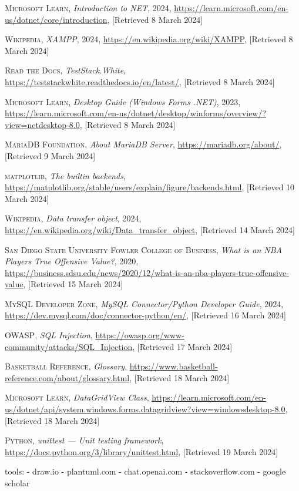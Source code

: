 \documentclass{thesis-ekf}
\theoremstyle{definition}
\theoremstyle{remark}
\begin{document}
\begin{thebibliography}{2}
\textsc{Microsoft Learn},
\emph{Introduction to NET}, 2024, 
\url{https://learn.microsoft.com/en-us/dotnet/core/introduction}, [Retrieved 8 March 2024]

\textsc{Wikipedia},
\emph{XAMPP}, 2024,
\url{https://en.wikipedia.org/wiki/XAMPP}, [Retrieved 8 March 2024]

\textsc{Read the Docs},
\emph{TestStack.White},
\url{https://teststackwhite.readthedocs.io/en/latest/}, [Retrieved 8 March 2024]

\textsc{Microsoft Learn},
\emph{Desktop Guide (Windows Forms .NET)}, 2023,
\url{https://learn.microsoft.com/en-us/dotnet/desktop/winforms/overview/?view=netdesktop-8.0}, [Retrieved 8 March 2024]

\textsc{MariaDB Foundation},
\emph{About MariaDB Server},
\url{https://mariadb.org/about/}, [Retrieved 9 March 2024]

\textsc{matplotlib},
\emph{The builtin backends},
\url{https://matplotlib.org/stable/users/explain/figure/backends.html}, [Retrieved 10 March 2024]

\textsc{Wikipedia},
\emph{Data transfer object}, 2024,
\url{https://en.wikipedia.org/wiki/Data_transfer_object}, [Retrieved 14 March 2024]

\textsc{San Diego State University Fowler College of Business},
\emph{What is an NBA Players True Offensive Value?}, 2020,
\url{https://business.sdsu.edu/news/2020/12/what-is-an-nba-players-true-offensive-value}, [Retrieved 15 March 2024]

\textsc{MySQL Developer Zone},
\emph{MySQL Connector/Python Developer Guide}, 2024,
\url{https://dev.mysql.com/doc/connector-python/en/}, [Retrieved 16 March 2024]

\textsc{OWASP},
\emph{SQL Injection},
\url{https://owasp.org/www-community/attacks/SQL_Injection}, [Retrieved 17 March 2024]

\textsc{Basketball Reference},
\emph{Glossary},
\url{https://www.basketball-reference.com/about/glossary.html}, [Retrieved 18 March 2024]

\textsc{Microsoft Learn},
\emph{DataGridView Class},
\url{https://learn.microsoft.com/en-us/dotnet/api/system.windows.forms.datagridview?view=windowsdesktop-8.0}, [Retrieved 18 March 2024]

\textsc{Python},
\emph{unittest — Unit testing framework},
\url{https://docs.python.org/3/library/unittest.html}, [Retrieved 19 March 2024]

\end{thebibliography}

tools:
- draw.io
- plantuml.com
- chat.openai.com
- stackoverflow.com
- google scholar
\end{document}
